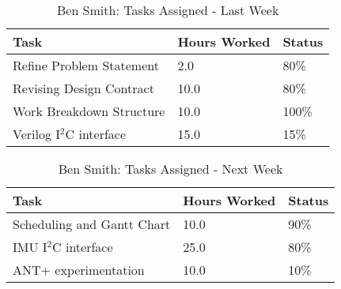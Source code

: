 \documentclass[12pt,compsoc]{IEEEtran}
\begin{document}
	\begin{table}[ht]
	\renewcommand{\arraystretch}{1.3}
		\caption{Ben Smith: Tasks Assigned - Last Week}
		
		\label{Summary of Ben Smith's activities: last week}
		
		\centering
		\begin{tabular}{p{5.5cm}|p{1cm}|p{1cm}}

		\hline
		\bfseries 		Task				        & \bfseries Hours Worked	& \bfseries Status	\\
		\hline\hline
					Refine Problem Statement		& 2.0						& 80\%				\\
                    Revising Design Contract        & 10.0                      & 80\%              \\
                    Work Breakdown Structure        & 10.0                      & 100\%            	\\
                    Verilog I$^2$C interface           & 15.0                      & 15\%              \\
		\hline
		\end{tabular}
	\end{table}

	\begin{table}[ht]
	\renewcommand{\arraystretch}{1.3}
		\caption{Ben Smith: Tasks Assigned - Next Week}
		
		\label{Summary of Ben Smith's activites: this week}
		
		\centering
		\begin{tabular}{p{5.5cm}|p{1cm}|p{1cm}}

		\hline
		\bfseries 	Task	            	 		& \bfseries Hours Worked	& \bfseries Status	\\
		\hline\hline
					Scheduling and Gantt Chart	    & 10.0						& 90\%				\\
                    IMU I$^2$C interface               & 25.0                      & 80\%              \\
                    ANT+ experimentation 		    & 10.0						& 10\%				\\
		\hline
		\end{tabular}
	\end{table}

\end{document}
